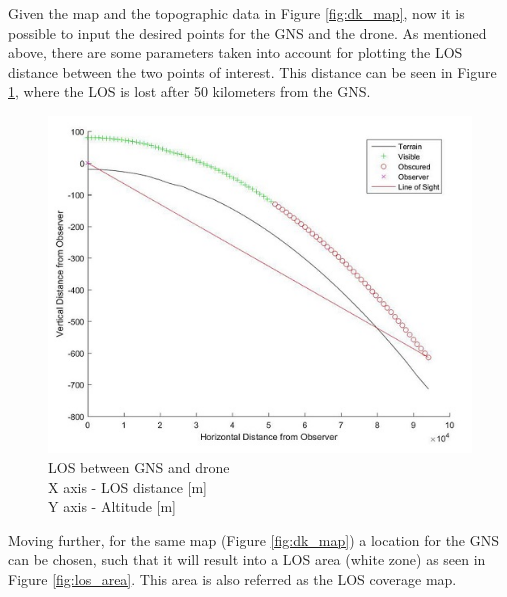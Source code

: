 Given the map and the topographic data in Figure \ref{fig:dk_map}, now it is possible to input the desired points for the GNS and the drone. As mentioned above, there are some parameters taken into account for plotting the LOS distance between the two points of interest. This distance can be seen in Figure \ref{fig:los_2p}, where the LOS is lost after 50 kilometers from the GNS.

\begin{figure}[h]
	\centering
	\includegraphics[scale=2.5]{figures/los_2points.jpg}
	\caption{LOS between GNS and drone \\ X axis - LOS distance [m] \\ Y axis - Altitude [m]}
   	\label{fig:los_2p}
\end{figure}

Moving further, for the same map (Figure \ref{fig:dk_map}) a location for the GNS can be chosen, such that it will result into a LOS area (white zone) as seen in Figure \ref{fig:los_area}. This area is also referred as the LOS coverage map.

